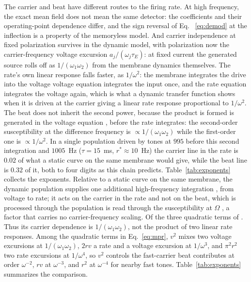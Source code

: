 \documentclass[11pt,a4paper]{article}
\providecommand{\DIFaddtex}[1]{{\protect\color{blue} \sf #1}} %
\providecommand{\DIFdeltex}[1]{{\protect\color{red} \scriptsize #1}} %
\providecommand{\DIFaddbegin}{} %
\providecommand{\DIFaddend}{} %
\providecommand{\DIFdelbegin}{} %
\providecommand{\DIFdelend}{} %
\providecommand{\DIFadd}[1]{\texorpdfstring{\DIFaddtex{#1}}{#1}} %
\providecommand{\DIFdel}[1]{\texorpdfstring{\DIFdeltex{#1}}{}} %
\begin{document}
\DIFadd{The carrier and beat have different routes to the firing rate. At high frequency,
}\DIFaddend the \DIFdelbegin \DIFdel{exact mean field does not mean the same
detector: the coefficients and their operating-point dependence differ, and the sign
reversal of Eq. ~\eqref{eq:demod} at the inflection is a property of the memoryless model.
And carrier independence at fixed polarization survives in the dynamic model,
with
polarization now the carrier-frequency voltage excursion $a_j/(\omega_j\tau_E)$: at fixed
current the generated source rolls off as $1/(\omega_1\omega_2)$ from the membrane dynamics
themselves. The rate's own linear response falls faster, as $1/\omega^2$: the membrane
integrates the drive into the voltage }\DIFdelend \DIFaddbegin \DIFadd{voltage equation integrates the input once, }\DIFaddend and the rate equation integrates
the voltage again, \DIFdelbegin \DIFdel{which is
what a dynamic transfer function shows when it is driven at the carrier}\DIFdelend \DIFaddbegin \DIFadd{giving a linear rate response proportional to $1/\omega^2$}\DIFaddend .
The beat \DIFdelbegin \DIFdel{does not
inherit the second power, because the product is formed }\DIFdelend \DIFaddbegin \DIFadd{is generated }\DIFaddend in the voltage equation \DIFdelbegin \DIFdel{, before the
rate integrates: the second-order susceptibility at the difference frequency is
$\propto1/(\omega_1\omega_2)$ while the first-order one is $\propto1/\omega^2$. In a single
population driven by tones at $995$ }\DIFdelend \DIFaddbegin \DIFadd{before this second integration }\DIFaddend and
\DIFdelbegin \DIFdel{$1005$~Hz ($\tau=15$~ms, $r^*\approx10$~Hz) the carrier
line in the rate is $0.02$ of what a static curve on the same membrane would give, while the
beat line is $0.32$ of it, both to four digits as this chain predicts. Table~\ref{tab:exponents}
collects the exponents. Relative to a static curve on the same membrane, the dynamic population
supplies one additional high-frequency integration , from voltage to rate; it acts on the carrier
in the rate and
not on the beat, which is processed through the population }\DIFdelend \DIFaddbegin \DIFadd{is read through the }\DIFaddend susceptibility at $\Omega$\DIFdelbegin \DIFdel{, a factor that carries no carrier-frequency scaling. Of the
three quadratic terms of
}\DIFdelend \DIFaddbegin \DIFadd{. Thus its carrier dependence is
$1/(\omega_1\omega_2)$, not the product of two linear rate responses. Among the
quadratic terms in }\DIFaddend Eq.~\eqref{eq:mpr}, $v^2$ \DIFdelbegin \DIFdel{mixes two voltage excursions at $1/(\omega_1\omega_2)$,
$2rv$ a rate
and a voltage excursion at $1/\omega^3$, and $\pi^2r^2$ two rate excursions at $1/\omega^4$, so
$v^2$ controls the fast-carrier beat}\DIFdelend \DIFaddbegin \DIFadd{contributes at order $\omega^{-2}$,
$rv$ at $\omega^{-3}$, and $r^2$ at $\omega^{-4}$ for nearby fast tones.
Table~\ref{tab:exponents} summarizes the comparison}\DIFaddend .
\end{document}
